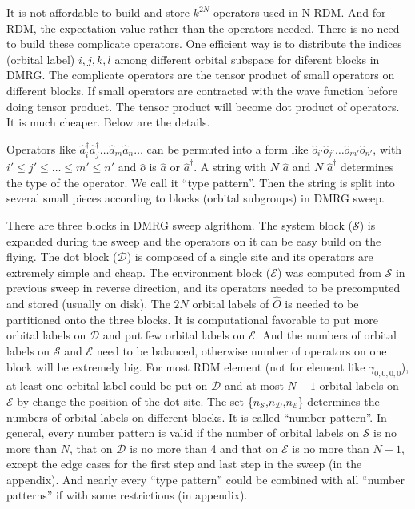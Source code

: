 It is not affordable to build and store $k^{2N}$ operators used in N-RDM.
And for RDM, the expectation value rather than the operators needed. There is no need to build these complicate operators.
One efficient way is to distribute the indices (orbital label) $i,j,k,l$ among different orbital subspace for diferent blocks in DMRG.\cite{ghosh_orbital_2008,zgid_density_2008} 
The complicate operators are the tensor product of small operators on different blocks. If small operators are contracted with the wave function before doing tensor product. The tensor product will become dot product of operators. It is much cheaper. Below are the details.

  Operators like $\hat{a}^\dagger_i\hat{a}^\dagger_j\dots \hat{a}_m\hat{a}_n\dots$ can be permuted into a form like $\hat{o}_{i'}\hat{o}_{j'}\dots \hat{o}_{m'}\hat{o}_{n'}$, with $i'\le j'\le \dots \le m' \le n'$ and $\hat{o}$ is $\hat{a}$ or $\hat{a}^\dagger$. A string with $N$ $\hat{a}$ and $N$ $\hat{a}^\dagger$ determines the type of the operator. 
We call it ``type pattern''. 
Then the string is split into several small pieces according to blocks (orbital subgroups) in DMRG sweep. 

There are three blocks in DMRG sweep algrithom.
The system block ($\mathcal{S}$) is expanded during the sweep and the operators on it can be easy build on the flying. The dot block ($\mathcal{D}$) is composed of a single site and its operators are extremely simple and cheap. The environment block ($\mathcal{E}$) was computed from $\mathcal{S}$ in previous sweep in reverse direction, and its operators needed to be precomputed and stored (usually on disk). 
The $2N$ orbital labels of $\hat{O}$ is needed to be partitioned onto the three blocks. It is computational favorable to put more orbital labels on $\mathcal{D}$ and put few orbital labels on $\mathcal{E}$. And the numbers of orbital labels on $\mathcal{S}$ and $\mathcal{E}$ need to be balanced, otherwise number of operators on one block will be extremely big. For most RDM element (not for element like $\gamma_{0,0,0,0}$), at least one orbital label could be put on $\mathcal{D}$ and at most $N-1$ orbital labels on $\mathcal{E}$ by change the position of the dot site. The set \{$n_\mathcal{S}$,$n_\mathcal{D}$,$n_\mathcal{E}$\} determines the numbers of orbital labels on different blocks. It is called ``number pattern''. In general, every number pattern is valid if the number of orbital labels on $\mathcal{S}$ is no more than $N$, that on $\mathcal{D}$ is no more than 4 and that on $\mathcal{E}$ is no more than $N-1$, except the edge cases for the first step and last step in the sweep (in the appendix).
And nearly every ``type pattern'' could be combined with all ``number patterns'' if with some restrictions (in appendix).   

